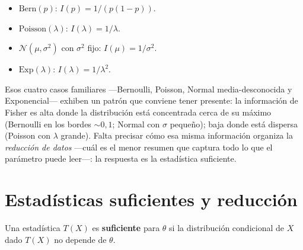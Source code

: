 \begin{example}
	\begin{itemize}
		\item $\mathrm{Bern}(p)$: $I(p) = 1/(p(1-p))$.
		\item $\mathrm{Poisson}(\lambda)$: $I(\lambda) = 1/\lambda$.
		\item $\mathcal{N}(\mu, \sigma^2)$ con $\sigma^2$ fijo: $I(\mu) = 1/\sigma^2$.
		\item $\mathrm{Exp}(\lambda)$: $I(\lambda) = 1/\lambda^2$.
	\end{itemize}
\end{example}

\bigskip
\noindent
Esos cuatro casos familiares ---Bernoulli, Poisson, Normal media-desconocida y Exponencial--- exhiben un patrón que conviene tener presente: la información de Fisher es alta donde la distribución está concentrada cerca de su máximo (Bernoulli en los bordes $\sim 0, 1$; Normal con $\sigma$ pequeño); baja donde está dispersa (Poisson con $\lambda$ grande). Falta precisar cómo esa misma información organiza la \emph{reducción de datos} ---cuál es el menor resumen que captura todo lo que el parámetro puede leer---: la respuesta es la estadística suficiente.

\begin{center}
\end{center}

\section{Estadísticas suficientes y reducción}

\begin{definition}
	Una estadística $T(X)$ es \textbf{suficiente} para $\theta$ si la distribución condicional de $X$ dado $T(X)$ no depende de $\theta$.
\end{definition}

